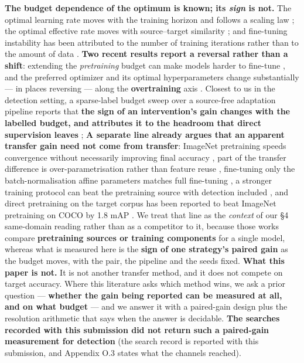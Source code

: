 \documentclass[pdflatex,sn-mathphys-ay]{sn-jnl}
\begin{document}
\textbf{The budget dependence of the optimum is known; its \emph{sign} is not.} The optimal learning rate moves with the training horizon and follows a scaling law \citep{bjorck2025}; the optimal effective rate moves with source--target similarity \citep{li2020b}; and fine-tuning instability has been attributed to the number of training iterations rather than to the amount of data \citep{mosbach2021}. \textbf{Two recent results report a reversal rather than a shift}: extending the \emph{pretraining} budget can make models harder to fine-tune \citep{springer2025}, and the preferred optimizer and its optimal hyperparameters change substantially --- in places reversing --- along the \textbf{overtraining} axis \citep{everett2026}. Closest to us in the detection setting, a sparse-label budget sweep over a source-free adaptation pipeline reports that \textbf{the sign of an intervention's gain changes with the labelled budget, and attributes it to the headroom that direct supervision leaves} \citep{zhang2026}; \textbf{A separate line already argues that an apparent transfer gain need not come from transfer}: ImageNet pretraining speeds convergence without necessarily improving final accuracy \citep{he2019}, part of the transfer difference is over-parametrisation rather than feature reuse \citep{raghu2019}, fine-tuning only the batch-normalisation affine parameters matches full fine-tuning \citep{kanavati2021}, a stronger training protocol can beat the pretraining source with detection included \citep{pototzky2022}, and direct pretraining on the target corpus has been reported to beat ImageNet pretraining on COCO by 1.8 mAP \citep{li2021}. We treat that line as the \emph{context} of our \S{}4 same-domain reading rather than as a competitor to it, because those works compare \textbf{pretraining sources or training components} for a single model, whereas what is measured here is the \textbf{sign of one strategy's paired gain} as the budget moves, with the pair, the pipeline and the seeds fixed. \textbf{What this paper is not.} It is not another transfer method, and it does not compete on target accuracy. Where this literature asks which method wins, we ask a prior question --- \textbf{whether the gain being reported can be measured at all, and on what budget} --- and we answer it with a paired-gain design plus the resolution arithmetic that says when the answer is decidable. \textbf{The searches recorded with this submission did not return such a paired-gain measurement for detection} (the search record is reported with this submission, and Appendix O.3 states what the channels reached).
\end{document}
